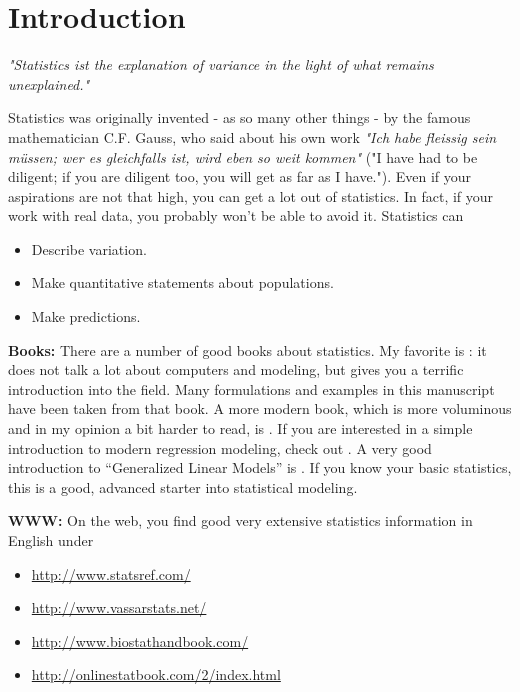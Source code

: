 \chapter{Introduction}

\emph{"Statistics ist the explanation of variance in the light of what remains
unexplained."}

\vspace{5 mm}

Statistics was originally invented - as so many other things - by the famous mathematician C.F. Gauss, who said about his own work \emph{"Ich habe fleissig sein m\"ussen; wer es gleichfalls ist, wird eben so weit kommen"} ("I have had to be diligent; if you are diligent too, you will get as far as I have."). Even if your aspirations are not that high, you can get a lot out of statistics. In fact, if your work with real data, you probably won't be able to avoid it. Statistics can

\begin{itemize}
  \item Describe variation.
  \item Make quantitative statements about populations.
  \item Make predictions.
\end{itemize}

\textbf{Books: }There are a number of good books about statistics. My favorite is \cite{altman99}: it does not talk a lot about computers and modeling, but gives you a terrific introduction into the field. Many formulations and examples in this manuscript have been taken from that book. A more modern book, which is more voluminous and in my opinion a bit harder to read, is \cite{Riffenburgh2012}. If you are interested in a simple introduction to modern regression modeling, check out \cite{Kaplan2009}. A very good introduction to “Generalized Linear Models” is \cite{Dobson2008}. If you know your basic statistics, this is a good, advanced starter into statistical modeling.

\vspace{5 mm}

\textbf{WWW: }On the web, you find good very extensive statistics information in English under
\begin{itemize}
    \item \url{http://www.statsref.com/}
    \item \url{http://www.vassarstats.net/}
    \item \url{http://www.biostathandbook.com/}
    \item \url{http://onlinestatbook.com/2/index.html}
\end{itemize}

